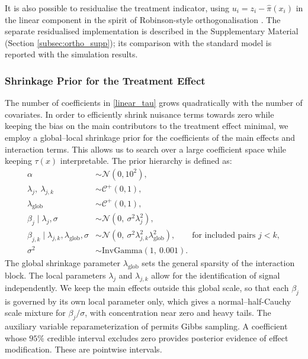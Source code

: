 \documentclass[12pt]{article}
\begin{document}
It is also possible to residualise the treatment indicator, using $u_i=z_i-\hat{\pi}(x_i)$ in the linear component in the spirit of Robinson-style orthogonalisation \citep{robinson1988root}. The separate residualised implementation is described in the Supplementary Material (Section \ref{subsec:ortho_supp}); its comparison with the standard model is reported with the simulation results.

\subsubsection{Shrinkage Prior for the Treatment Effect}
\label{subsec:inference}
The number of coefficients in \eqref{linear_tau} grows quadratically with the number of covariates. In order to efficiently shrink nuisance terms towards zero while keeping the bias on the main contributors to the treatment effect minimal, we employ a global--local shrinkage prior \citep{carvalho2010horseshoe} for the coefficients of the main effects and interaction terms. This allows us to search over a large coefficient space while keeping $\tau(x)$ interpretable. The prior hierarchy is defined as:
\begin{align}
    \alpha &\sim \mathcal{N}(0, 10^2), \nonumber\\
    \lambda_{j},\ \lambda_{j,k} &\sim \mathcal{C}^+(0, 1), \nonumber\\
    \lambda_{\mathrm{glob}} &\sim \mathcal{C}^+(0, 1), \nonumber\\
    \beta_{j} \mid \lambda_{j}, \sigma &\sim
      \mathcal{N}\!\left(0,\ \sigma^2 \lambda_{j}^2\right),
      \label{eq:hshc_main}\\
    \beta_{j,k} \mid \lambda_{j,k}, \lambda_{\mathrm{glob}}, \sigma &\sim
      \mathcal{N}\!\left(0,\ \sigma^2 \lambda_{j,k}^2 \lambda_{\mathrm{glob}}^2\right),
      \qquad \text{for included pairs }j<k, \label{eq:hshc_int}\\
    \sigma^2 &\sim \mathrm{InvGamma}(1,\ 0.001). \nonumber
\end{align}
The global shrinkage parameter $\lambda_{\mathrm{glob}}$ sets the general sparsity of the interaction block. The local parameters $\lambda_{j}$ and $\lambda_{j,k}$ allow for the identification of signal independently. We keep the main effects outside this global scale, so that each $\beta_j$ is governed by its own local parameter only, which gives a normal--half-Cauchy scale mixture for $\beta_j/\sigma$, with concentration near zero and heavy tails. The auxiliary variable reparameterization of \cite{makalic2015simple} permits Gibbs sampling. A coefficient whose $95\%$ credible interval excludes zero provides posterior evidence of effect modification. These are pointwise intervals.
\end{document}
